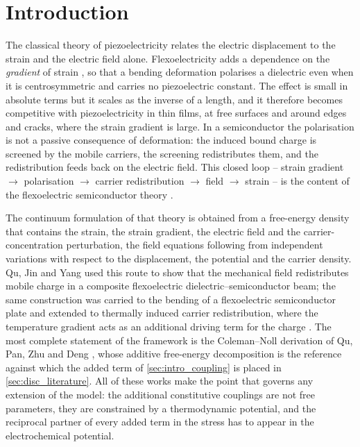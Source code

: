\section{Introduction}
\label{sec:intro}

The classical theory of piezoelectricity relates the electric displacement to
the strain and the electric field alone.  Flexoelectricity adds a dependence on
the \emph{gradient} of strain \cite{shen2010theory,deng2020impact}, so that a
bending deformation polarises a dielectric even when it is centrosymmetric and
carries no piezoelectric constant.  The effect is small in absolute terms but
it scales as the inverse of a length, and it therefore becomes competitive with
piezoelectricity in thin films, at free surfaces and around edges and cracks,
where the strain gradient is large.  In a semiconductor the polarisation is not
a passive consequence of deformation: the induced bound charge is screened by
the mobile carriers, the screening redistributes them, and the redistribution
feeds back on the electric field.  This closed loop -- strain gradient
$\rightarrow$ polarisation $\rightarrow$ carrier redistribution $\rightarrow$
field $\rightarrow$ strain -- is the content of the flexoelectric
semiconductor theory \cite{qu2020mobile,qu2022thermal}.

The continuum formulation of that theory is obtained from a free-energy density
that contains the strain, the strain gradient, the electric field and the
carrier-concentration perturbation, the field equations following from
independent variations with respect to the displacement, the potential and the
carrier density.  Qu, Jin and Yang \cite{qu2020mobile} used this route to show
that the mechanical field redistributes mobile charge in a composite
flexoelectric dielectric--semiconductor beam; the same construction was carried
to the bending of a flexoelectric semiconductor plate \cite{qu2022bending} and
extended to thermally induced carrier redistribution, where the temperature
gradient acts as an additional driving term for the charge
\cite{qu2022thermal}.  The most complete statement of the framework is the
Coleman--Noll derivation of Qu, Pan, Zhu and Deng \cite{qu2025thermodynamic},
whose additive free-energy decomposition is the reference against which the
added term of \cref{sec:intro_coupling} is placed in
\cref{sec:disc_literature}.  All of these works make the point that governs any
extension of the model: the additional constitutive couplings are not free
parameters, they are constrained by a thermodynamic potential, and the
reciprocal partner of every added term in the stress has to appear in the
electrochemical potential.

